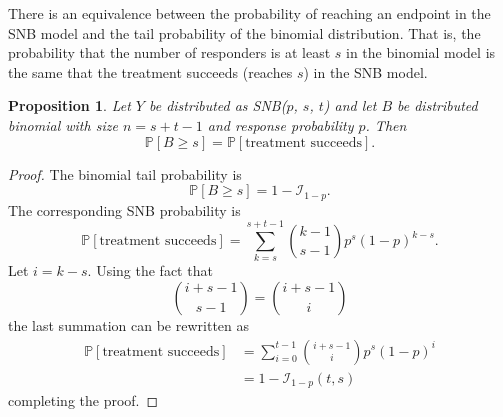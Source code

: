 \documentclass[review]{elsarticle}
\newtheorem{prop}{Proposition}
\begin{document}
There is an equivalence between the probability of reaching an endpoint 
in the SNB model and the tail probability of the binomial distribution.
That is, the probability that the number of responders is at least $s$ in the 
binomial model is the same that the treatment succeeds (reaches $s$) in the SNB 
model.
\begin{prop} \label{binomial_tail}
Let $Y$ be distributed as SNB($p$, $s$, $t$) and let 
$B$ be distributed binomial with size $n=s+t-1$ and response probability
$p$. Then
\begin{equation}
\mathbb{P}[B \geq s] = \mathbb{P} [\text{treatment succeeds}].
\end{equation}
\end{prop}
\begin{proof}
The binomial tail probability is
\begin{equation*}
\mathbb{P}[B \geq s] = 1 - \mathcal{I}_{1-p}.
\end{equation*}
The corresponding SNB probability is
\begin{equation*}
\mathbb{P} [\text{treatment succeeds}] 
  = \sum_{k=s}^{s+t-1} {k-1 \choose s-1} p^s (1-p)^{k-s}.
\end{equation*}
Let $i=k-s$. Using the fact that
\begin{equation*}
{i+s-1 \choose s-1} = {i+s-1 \choose i}
\end{equation*}
the last summation can be rewritten as
\begin{align}
\mathbb{P} [\text{treatment succeeds}] &= \sum_{i=0}^{t-1} 
  {i+s-1 \choose i} p^s (1-p)^i\\
  &= 1 - \mathcal{I}_{1-p}(t, s)
\end{align}
completing the proof.
\end{proof}
\end{document}
